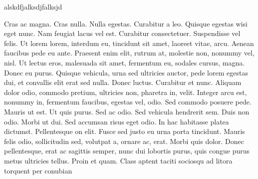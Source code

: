 \color{red}alskdfjalksdjfalksjd \color{black}

Cras ac magna. Cras nulla. Nulla egestas. Curabitur a leo. Quisque
egestas wisi eget nunc. Nam feugiat lacus vel est. Curabitur consectetuer.
Suspendisse vel felis. Ut lorem lorem, interdum eu, tincidunt sit amet, laoreet
vitae, arcu. Aenean faucibus pede eu ante. Praesent enim elit, rutrum at,
molestie non, nonummy vel, nisl. Ut lectus eros, malesuada sit amet, fermentum
eu, sodales cursus, magna. Donec eu purus. Quisque vehicula, urna sed ultricies
auctor, pede lorem egestas dui, et convallis elit erat sed nulla. Donec luctus.
Curabitur et nunc. Aliquam dolor odio, commodo pretium, ultricies non, pharetra
in, velit. Integer arcu est, nonummy in, fermentum faucibus, egestas vel, odio.
Sed commodo posuere pede. Mauris ut est. Ut quis purus. Sed ac odio. Sed
vehicula hendrerit sem. Duis non odio. Morbi ut dui. Sed accumsan risus eget
odio. In hac habitasse platea dictumst. Pellentesque on elit. Fusce sed justo eu
urna porta tincidunt. Mauris felis odio, sollicitudin sed, volutpat a, ornare
ac, erat. Morbi quis dolor. Donec pellentesque, erat ac sagittis semper, nunc
dui lobortis purus, quis congue purus metus ultricies tellus. Proin et quam.
Class aptent taciti sociosqu ad litora torquent per conubian

